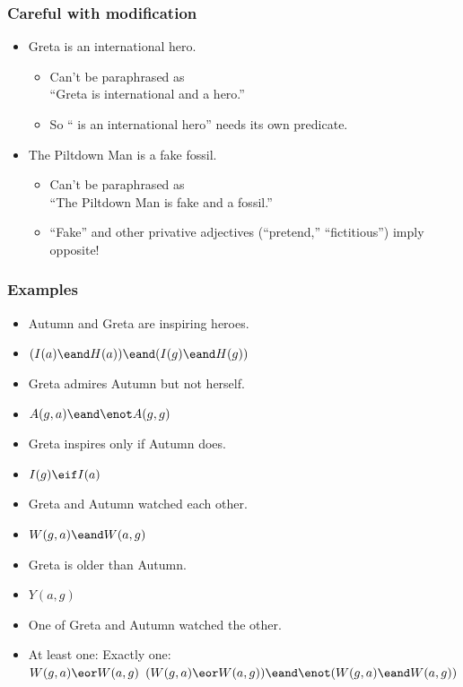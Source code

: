\begin{frame}
\frametitle{Careful with modification}

\begin{itemize}[<+->]
\item Greta is an international hero.
\begin{itemize}
  \item Can't be paraphrased as\\
  ``Greta is international and a hero.''
  \item So ``\gap{} is an international hero'' needs its own
  predicate.
\end{itemize}
\item The Piltdown Man is a fake fossil.
\begin{itemize}[<+->]
  \item Can't be paraphrased as\\
  ``The Piltdown Man is fake and a fossil.''
  \item ``Fake'' and other privative adjectives (``pretend,''
  ``fictitious'') imply opposite!
\end{itemize}
\end{itemize}
\end{frame}

\begin{frame}
\frametitle{Examples}

\begin{itemize}[<+->]
  \item Autumn and Greta are inspiring heroes.\\
  \item[] \alert{$(I(a) \eand H(a)) \eand (I(g) \eand H(g))$}
  \item Greta admires Autumn but not herself.\\
  \item[] \alert{$A(g,a) \eand \enot A(g,g)$}
  \item Greta inspires only if Autumn does.
  \item[] \alert{$I(g) \eif I(a)$}
  \item Greta and Autumn watched each other.
  \item[] \alert{$W(g,a) \eand W(a,g)$} 
  \item Greta is older than Autumn.
  \item[] \alert{$Y(a,g)$}  
  \item One of Greta and Autumn watched the other.
  \item[] At least one: \hfill Exactly one:\\
  \alert{$W(g,a) \eor W(a, g)$} \hfill \alert{$(W(g,a) \eor W(a, g)) \eand \enot(W(g,a) \eand W(a,g))$}
\end{itemize}
\end{frame}

